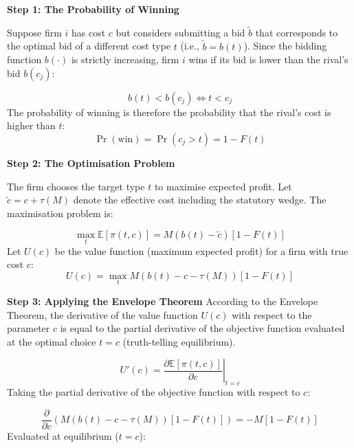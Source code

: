 \documentclass[12pt]{article}
\begin{document}
\textbf{Step 1: The Probability of Winning} \vspace{1em}

Suppose firm $i$ has cost $c$ but considers submitting a bid $\tilde{b}$ that corresponds to the optimal bid of a different cost type $t$ (i.e., $\tilde{b} = b(t)$). Since the bidding function $b(\cdot)$ is strictly increasing, firm $i$ wins if its bid is lower than the rival's bid $b(c_j)$:

\begin{equation}
    b(t) < b(c_j) \iff t < c_j
\end{equation}
The probability of winning is therefore the probability that the rival's cost is higher than $t$:
\begin{equation}
    \Pr(\text{win}) = \Pr(c_j > t) = 1 - F(t)
\end{equation}

\textbf{Step 2: The Optimisation Problem} \vspace{1em}

The firm chooses the target type $t$ to maximise expected profit. Let $\tilde{c} = c + \tau(M)$ denote the effective cost including the statutory wedge. The maximisation problem is:

\begin{equation}
    \max_{t} \mathbb{E}[\pi(t, c)] = M(b(t) - \tilde{c})[1 - F(t)]
\end{equation}
Let $U(c)$ be the value function (maximum expected profit) for a firm with true cost $c$:
\begin{equation}
    U(c) = \max_{t} M(b(t) - c - \tau(M))[1 - F(t)]
\end{equation}

\textbf{Step 3: Applying the Envelope Theorem} \vspace{1em}
According to the Envelope Theorem, the derivative of the value function $U(c)$ with respect to the parameter $c$ is equal to the partial derivative of the objective function evaluated at the optimal choice $t=c$ (truth-telling equilibrium).

\begin{equation}
    U'(c) = \left. \frac{\partial \mathbb{E}[\pi(t, c)]}{\partial c} \right|_{t=c}
\end{equation}
Taking the partial derivative of the objective function with respect to $c$:

\begin{equation}
    \frac{\partial}{\partial c} \left( M(b(t) - c - \tau(M))[1 - F(t)] \right) = -M[1 - F(t)]
\end{equation}
Evaluated at equilibrium ($t=c$):
\end{document}
